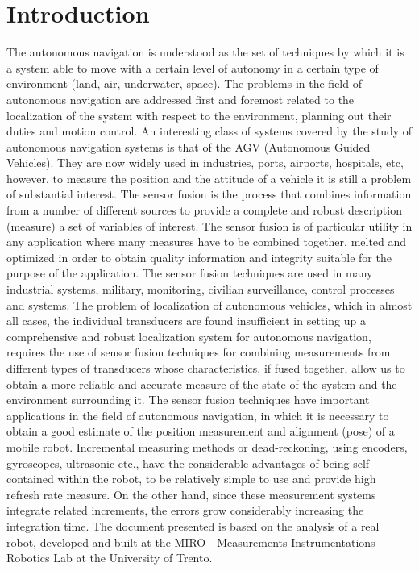 \section{Introduction}
The autonomous navigation is understood as the set of techniques by which it is a system able to move with a certain level of autonomy in a certain type of environment (land, air, underwater, space). The problems in the field of autonomous navigation are addressed first and foremost related to the localization of the system with respect to the environment, planning out their duties and motion control.
An interesting class of systems covered by the study of autonomous navigation systems is that of the AGV (Autonomous Guided Vehicles). They are now widely used in industries, ports, airports, hospitals, etc, however, to measure the position and the attitude of a vehicle it is still a problem of substantial interest.
The sensor fusion is the process that combines information from a number of different sources to provide a complete and robust description (measure) a set of variables of interest. The sensor fusion is of particular utility in any application where many measures have to be combined together, melted and optimized in order to obtain quality information and integrity suitable for the purpose of the application. The sensor fusion techniques are used in many industrial systems, military, monitoring, civilian surveillance, control processes and systems. The problem of localization of autonomous vehicles, which in almost all cases, the individual transducers are found insufficient in setting up a comprehensive and robust localization system for autonomous navigation, requires the use of sensor fusion techniques for combining measurements from different types of transducers whose characteristics, if fused together, allow us to obtain a more reliable and accurate measure of the state of the system and the environment surrounding it.
The sensor fusion techniques have important applications in the field of autonomous navigation, in which it is necessary to obtain a good estimate of the position measurement and alignment (pose) of a mobile robot. Incremental measuring methods or dead-reckoning, using encoders, gyroscopes, ultrasonic etc., have the considerable advantages of being self-contained within the robot, to be relatively simple to use and provide high refresh rate measure. On the other hand, since these measurement systems integrate related increments, the errors grow considerably increasing the integration time.
The document presented is based on the analysis of a real robot, developed and built at the MIRO - Measurements Instrumentations Robotics Lab at the University of Trento.
